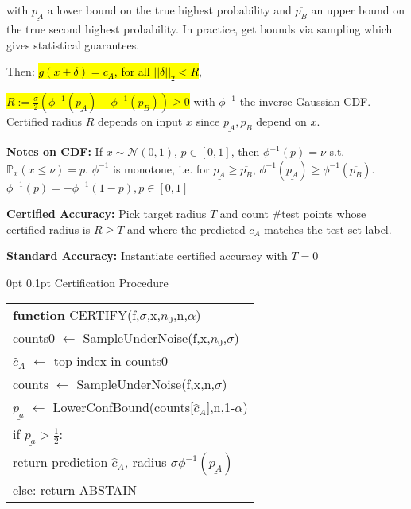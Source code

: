 \documentclass[11pt,landscape,a4paper,fleqn]{article}
\makeatletter
\renewcommand{\subsection}{\@startsection{subsection}{1}{0mm}%
                                {0pt}%
                                {0.1pt}%
                            	{\color{myorange2}\sffamily\small}}
\newcommand{\mhl}[1]{\setlength{\fboxsep}{0pt}\colorbox{yellow}{#1}}
\makeatother
\begin{document}
\begin{multicols*}{4}
with $\underline{p_A}$ a lower bound on the true highest probability and $\overline{p_B}$ an upper bound on the true second highest probability. In practice, get bounds via sampling which gives statistical guarantees.

Then: \hl{$g(x + \delta) = c_A$, for all $||\delta||_2 < R$}, 

\mhl{$R := \frac{\sigma}{2}(\phi^{-1}(\underline{p_A}) - \phi^{-1}(\overline{p_B})) \geq 0$} with $\phi^{-1}$ the inverse Gaussian CDF. Certified radius $R$ depends on input $x$ since $\underline{p_A}, \overline{p_B}$ depend on $x$.

\vspace*{1mm}
\textbf{Notes on CDF:} If $x \sim \mathcal{N}(0,1)$, $p \in [0,1]$, then $\phi^{-1}(p) = \nu$ s.t. $\mathbb{P}_x (x \leq \nu) = p$. $\phi^{-1}$ is monotone, i.e. for $\underline{p_A} \geq \overline{p_B}$, $\phi^{-1}(\underline{p_A}) \geq \phi^{-1}(\overline{p_B})$.
$\phi^{-1}(p) = -\phi^{-1}(1-p), p \in [0,1]$

\vspace*{1mm}
\textbf{Certified Accuracy:} Pick target radius $T$ and count \#test points whose certified radius is $R \geq T$ and where the predicted $c_A$ matches the test set label.

\textbf{Standard Accuracy:} Instantiate certified accuracy with $T = 0$

\vspace*{1mm}
\subsection{Certification Procedure}

\begin{tabular}{l}
\hline 
\textbf{function} CERTIFY(f,$\sigma$,x,$n_0$,n,$\alpha$) \hfill \\
\-\hspace{3mm} counts0 $\leftarrow$ SampleUnderNoise(f,x,$n_0$,$\sigma$) \hfill \\
\-\hspace{3mm} $\hat{c}_A$ $\leftarrow$ top index in counts0 \hfill \\
\-\hspace{3mm} counts $\leftarrow$ SampleUnderNoise(f,x,n,$\sigma$) \hfill \\
\-\hspace{3mm} $\underline{p_a}$ $\leftarrow$ LowerConfBound(counts[$\hat{c}_A$],n,1-$\alpha$) \hfill \\
\-\hspace{3mm} if $\underline{p_a} > \frac{1}{2}$: \hfill \\
\-\hspace*{6mm} return prediction $\hat{c}_A$, radius $\sigma \phi^{-1}(\underline{p_A})$ \hfill \\
\-\hspace{3mm} else: return ABSTAIN \hfill \\
\hline 
\end{tabular} 




\end{multicols*}
\end{document}
